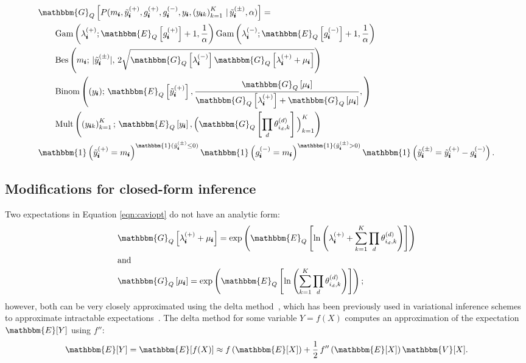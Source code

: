 \documentclass{article}
\newcommand{\subs}{\pmb{i}}
\newcommand{\wsup}[2]{#1_{\subs}^{(#2)}}
\newcommand{\ytP}{\wsup{\tilde{y}}{+}}
\newcommand{\ytPM}{\wsup{\tilde{y}}{\pm}}
\newcommand{\ysk}{y_{\subs k}}
\newcommand{\ys}{y_{\subs}}
\newcommand{\lamP}{\wsup{\lambda}{+}}
\newcommand{\lamM}{\wsup{\lambda}{-}}
\newcommand{\gP}{\wsup{g}{+}}
\newcommand{\gM}{\wsup{g}{-}}
\newcommand{\ms}{m_{\subs}}
\newcommand{\Eq}[1]{\mathbbm{E}_Q\left[#1\right]}
\newcommand{\Gq}[1]{\mathbbm{G}_Q\left[#1\right]}
\begin{document}
  \begin{align}
    \label{eqn:caviopt}
  &\Gq{P(\ms, \ytP, \gP, \gM, \ys, \left(\ysk\right)_{k=1}^K \,|\,\ytPM, \alpha)} = \notag \\
  &\quad \quad \text{Gam} \left(\lamP; \Eq{\gP} + 1, \frac{1}{\alpha} \right) \text{Gam} \left(\lamM; \Eq{\gM} + 1, \frac{1}{\alpha} \right) \notag \\
  &\quad \quad \text{Bes}\left(\ms;\, | \ytPM|,\,2\sqrt{\Gq{\lamM}\Gq{\lamP +\mu_{\subs}}}\right) \notag \\
  &\quad \quad \text{Binom}\left((\ys);\,
  \Eq{\ytP}, \frac{\Gq{\mu_{\subs}}}{\Gq{\lamP} + \Gq{\mu_{\subs}}},
  \right) \notag \\
  &\quad\quad \text{Mult}\left(\left(\ysk\right)_{k=1}^K;\, \Eq{\ys}, \Big(\Gq{ \prod_d \theta_{i_d,k}^{(d)} }\Big)_{k=1}^K\right) \notag \\
  &\mathbbm{1} \left(\ytP=\ms\right)^{\mathbbm{1}(\ytPM \leq 0)} \mathbbm{1} \left(\gM=\ms\right)^{\mathbbm{1}(\ytPM > 0)} \mathbbm{1}\left(\ytPM = \ytP - \gM\right).
  \end{align}

  \subsection{Modifications for closed-form inference}

  Two expectations in Equation \ref{eqn:caviopt} do not have an analytic form:
  \begin{align}
  \label{eqn:geomterm_1}
  &\Gq{\lamP + \mu_{\subs}} = \exp\left(\Eq{\ln \left(\lamP
    + \sum_{k=1}^K \prod_d \theta_{i_d,k}^{(d)} \right)}\right) \\
  \intertext{and}
  \label{eqn:geomterm_2}
  &\Gq{\mu_{\subs}} = \exp\left(\Eq{\ln \left(\sum_{k=1}^K \prod_d \theta_{i_d,k}^{(d)} \right)}\right);
  \end{align}
  however, both can be very closely approximated using the delta
  method~\citep{ver2012invented}, which has been previously used in variational
  inference schemes to approximate intractable
  expectations~\citep{braun2010variational,wang2013variational}. The delta method
  for some variable $Y = f(X)$ computes an approximation of the expectation $\mathbbm{E}[Y]$ using $f''$:
  \begin{equation}
  \mathbbm{E}[Y] = \mathbbm{E}[f(X)] \approx f\left(\mathbbm{E}[X]\right) + \frac{1}{2} \, f''\left(\mathbbm{E}[X]\right) \mathbbm{V}[X].
  \end{equation}
\end{document}
